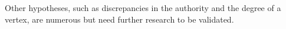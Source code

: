 																																																																																																																																																																																																																																																																																																																																																																																																															Other hypotheses,
																																																																																																																																																																																																																																																																																																																																																																																																															such as discrepancies in the authority and the degree of a vertex,
																																																																																																																																																																																																																																																																																																																																																																																																															are numerous but need further research to be validated.

